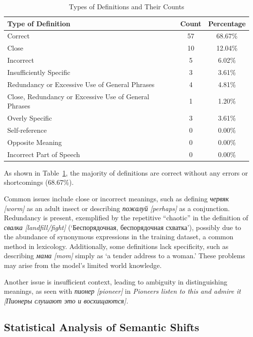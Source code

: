 \documentclass[11pt]{article}
\begin{document}
\begin{table}[H]
\centering
\caption{Types of Definitions and Their Counts}
\label{tab:definitions_classification}
\begin{tabular}{|>{\raggedright\arraybackslash}p{8cm}|c|c|}
\hline
\textbf{Type of Definition} & \textbf{Count} & \textbf{Percentage} \\ \hline
Correct & 57 & 68.67\% \\ \hline
Close & 10 & 12.04\% \\ \hline
Incorrect & 5 & 6.02\% \\ \hline
Insufficiently Specific & 3 & 3.61\% \\ \hline
Redundancy or Excessive Use of General Phrases & 4 & 4.81\% \\ \hline
Close, Redundancy or Excessive Use of General Phrases & 1 & 1.20\% \\ \hline
Overly Specific & 3 & 3.61\% \\ \hline
Self-reference & 0 & 0.00\% \\ \hline
Opposite Meaning & 0 & 0.00\% \\ \hline
Incorrect Part of Speech & 0 & 0.00\% \\ \hline
\end{tabular}
\end{table}

As shown in Table~\ref{tab:definitions_classification}, the majority of definitions are correct without any errors or shortcomings (68.67\%).

Common issues include close or incorrect meanings, such as defining \textit{червяк [worm]} as an adult insect or describing \textit{пожалуй [perhaps]} as a conjunction.
Redundancy is present, exemplified by the repetitive “chaotic” in the definition of \textit{свалка [landfill/fight]} (‘Беспорядочная, беспорядочная схватка’),
possibly due to the abundance of synonymous expressions in the training dataset, a common method in lexicology.
Additionally, some definitions lack specificity, such as describing \textit{мама [mom]} simply as ‘a tender address to a woman.’
These problems may arise from the model's limited world knowledge.

Another issue is insufficient context, leading to ambiguity in distinguishing meanings,
as seen with \textit{пионер [pioneer]} in \textit{Pioneers listen to this and admire it [Пионеры слушают это и восхищаются].}

\subsection{Statistical Analysis of Semantic Shifts}
\end{document}
